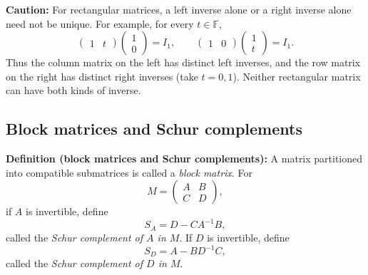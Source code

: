 \documentclass[a4paper,11pt,abstract=true]{scrartcl}
\theoremstyle{dotlessP}
\theoremstyle{dotlessS}
\theoremstyle{remark}
\theoremstyle{definition}
\begin{document}
\begin{remark_box}
\textbf{Caution:}
For rectangular matrices, a left inverse alone or a right inverse alone
need not be unique. For example, for every $t\in\mathbb{F}$,
\[
\begin{pmatrix}1&t\end{pmatrix}\begin{pmatrix}1\\0\end{pmatrix}
=I_1,\qquad
\begin{pmatrix}1&0\end{pmatrix}\begin{pmatrix}1\\t\end{pmatrix}
=I_1.
\]
Thus the column matrix on the left has distinct left inverses, and
the row matrix on the right has distinct right inverses (take $t=0,1$).
Neither rectangular matrix can have both kinds of inverse.
\end{remark_box}

\subsection{Block matrices and Schur complements}

\begin{definition_box}
\textbf{Definition (block matrices and Schur complements):} A matrix
partitioned into compatible submatrices is called a \emph{block matrix}.
For
\[
M=\begin{pmatrix}A&B\\C&D\end{pmatrix},
\]
if $A$ is invertible, define
\[
S_A=D-CA^{-1}B,
\]
called the \emph{Schur complement of $A$ in $M$}. If $D$ is invertible,
define
\[
S_D=A-BD^{-1}C,
\]
called the \emph{Schur complement of $D$ in $M$}.
\end{definition_box}
\end{document}
